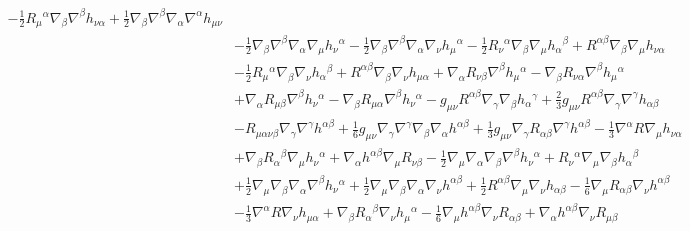 \documentclass[10pt,letterpaper]{article}
\begin{document}
\begin{align}
 -  \tfrac{1}{2} R_{\mu}{}^{\alpha} \nabla_{\beta}\nabla^{\beta}h_{\nu \alpha}
 + \tfrac{1}{2} \nabla_{\beta}\nabla^{\beta}\nabla_{\alpha}\nabla^{\alpha}h_{\mu \nu}\nonumber\\
& -  \tfrac{1}{2} \nabla_{\beta}\nabla^{\beta}\nabla_{\alpha}\nabla_{\mu}h_{\nu}{}^{\alpha}
 -  \tfrac{1}{2} \nabla_{\beta}\nabla^{\beta}\nabla_{\alpha}\nabla_{\nu}h_{\mu}{}^{\alpha}
 -  \tfrac{1}{2} R_{\nu}{}^{\alpha} \nabla_{\beta}\nabla_{\mu}h_{\alpha}{}^{\beta}
 + R^{\alpha \beta} \nabla_{\beta}\nabla_{\mu}h_{\nu \alpha}\nonumber\\
& -  \tfrac{1}{2} R_{\mu}{}^{\alpha} \nabla_{\beta}\nabla_{\nu}h_{\alpha}{}^{\beta}
 + R^{\alpha \beta} \nabla_{\beta}\nabla_{\nu}h_{\mu \alpha}
 + \nabla_{\alpha}R_{\nu \beta} \nabla^{\beta}h_{\mu}{}^{\alpha}
 -  \nabla_{\beta}R_{\nu \alpha} \nabla^{\beta}h_{\mu}{}^{\alpha}\nonumber\\
& + \nabla_{\alpha}R_{\mu \beta} \nabla^{\beta}h_{\nu}{}^{\alpha}
 -  \nabla_{\beta}R_{\mu \alpha} \nabla^{\beta}h_{\nu}{}^{\alpha}
 -  g_{\mu \nu} R^{\alpha \beta} \nabla_{\gamma}\nabla_{\beta}h_{\alpha}{}^{\gamma}
 + \tfrac{2}{3} g_{\mu \nu} R^{\alpha \beta} \nabla_{\gamma}\nabla^{\gamma}h_{\alpha \beta}\nonumber\\
& -  R_{\mu \alpha \nu \beta} \nabla_{\gamma}\nabla^{\gamma}h^{\alpha \beta}
 + \tfrac{1}{6} g_{\mu \nu} \nabla_{\gamma}\nabla^{\gamma}\nabla_{\beta}\nabla_{\alpha}h^{\alpha \beta}
 + \tfrac{1}{3} g_{\mu \nu} \nabla_{\gamma}R_{\alpha \beta} \nabla^{\gamma}h^{\alpha \beta}
 -  \tfrac{1}{3} \nabla^{\alpha}R \nabla_{\mu}h_{\nu \alpha}\nonumber\\
& + \nabla_{\beta}R_{\alpha}{}^{\beta} \nabla_{\mu}h_{\nu}{}^{\alpha}
 + \nabla_{\alpha}h^{\alpha \beta} \nabla_{\mu}R_{\nu \beta}
 -  \tfrac{1}{2} \nabla_{\mu}\nabla_{\alpha}\nabla_{\beta}\nabla^{\beta}h_{\nu}{}^{\alpha}
 + R_{\nu}{}^{\alpha} \nabla_{\mu}\nabla_{\beta}h_{\alpha}{}^{\beta}\nonumber\\
& + \tfrac{1}{2} \nabla_{\mu}\nabla_{\beta}\nabla_{\alpha}\nabla^{\beta}h_{\nu}{}^{\alpha}
 + \tfrac{1}{2} \nabla_{\mu}\nabla_{\beta}\nabla_{\alpha}\nabla_{\nu}h^{\alpha \beta}
 + \tfrac{1}{2} R^{\alpha \beta} \nabla_{\mu}\nabla_{\nu}h_{\alpha \beta}
 -  \tfrac{1}{6} \nabla_{\mu}R_{\alpha \beta} \nabla_{\nu}h^{\alpha \beta}\nonumber\\
& -  \tfrac{1}{3} \nabla^{\alpha}R \nabla_{\nu}h_{\mu \alpha}
 + \nabla_{\beta}R_{\alpha}{}^{\beta} \nabla_{\nu}h_{\mu}{}^{\alpha}
 -  \tfrac{1}{6} \nabla_{\mu}h^{\alpha \beta} \nabla_{\nu}R_{\alpha \beta}
 + \nabla_{\alpha}h^{\alpha \beta} \nabla_{\nu}R_{\mu \beta}\nonumber\\

\end{align}
\end{document}
